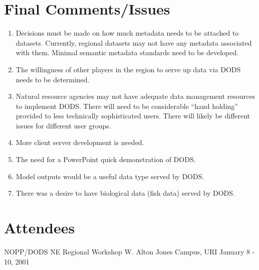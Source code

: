 \section{Final Comments/Issues}

\begin{enumerate}
\item Decisions must be made on how much metadata needs to be
  attached to datasets.  Currently, regional datasets may not have any
  metadata associated with them.  Minimal semantic metadata standards
  need to be developed.
\item The willingness of other players in the region to serve up data
  via DODS needs to be determined.
\item Natural resource agencies may not have adequate data management
  resources to implement DODS.  There will need to be considerable
  ``hand holding'' provided to less technically sophisticated users.
  There will likely be different issues for different user groups.
\item More client server development is needed.
\item The need for a PowerPoint quick demonstration of DODS.
\item Model outputs would be a useful data type served by DODS.
\item There was a desire to have biological data (fish data) served by DODS.
\end{enumerate}

\section{Attendees}
\label{IV,attendees}

NOPP/DODS NE Regional Workshop
W. Alton Jones Campus, URI
January 8 - 10, 2001

